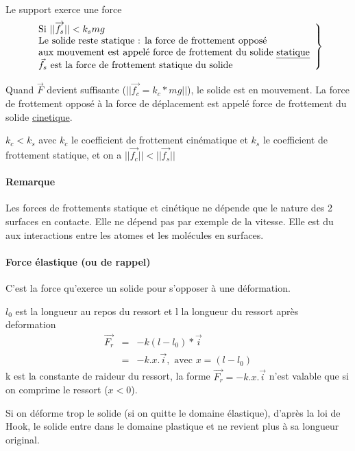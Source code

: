 Le support exerce une force \[
	\left.
	\begin{array}{l}
		\text{Si } ||\overrightarrow{f_s}|| < k_smg\\
	\text{Le solide reste statique : la force de frottement opposé} \\
	\text{aux mouvement est appelé force de frottement du solide \ul{statique}}\\
	\text{$\vec{f_s}$ est la force de frottement statique du solide}
	\end{array}
	\right\}
\]

Quand $\vec{F}$ devient suffisante ($||\overrightarrow{f_c} = k_c*mg||$), le solide est en mouvement. La force de frottement opposé à la force de déplacement est appelé force de frottement du solide \ul{cinetique}.

$k_c < k_s$ avec $k_c$ le coefficient de frottement cinématique et $k_s$ le coefficient de frottement statique, et on a $||\overrightarrow{f_c}|| < ||\overrightarrow{f_s}||$
\paragraph{Remarque} Les forces de frottements statique et cinétique ne dépende que le nature des 2 surfaces en contacte. Elle ne dépend pas par exemple de la vitesse.
Elle est du aux interactions entre les atomes et les molécules en surfaces.

\newpage

\paragraph{Force élastique (ou de rappel)} C'est la force qu'exerce un solide pour s'opposer à une déformation.

\begin{wrapfigure}{r}{0pt}
\end{wrapfigure}
$l_0$ est la longueur au repos du ressort et l la longueur du ressort après deformation
\[\begin{array}{rcl}
	\overrightarrow{F_r} &=& -k(l-l_0)*\vec{i} \\
										&=& -k.x.\vec{i}, \text{ avec }x=(l-l_0)
\end{array}\]
k est la constante de raideur du ressort, la forme $\vec{F_r} = -k.x.\vec{i}$ n'est valable que si on comprime le ressort ($x<0$).

Si on déforme trop le solide (si on quitte le domaine élastique), d'après la loi de Hook, le solide entre dans le domaine plastique et ne revient plus à sa longueur original.
